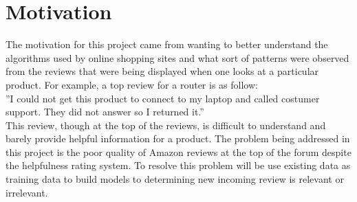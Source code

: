 \section{Motivation}
The motivation for this project came from wanting to better understand the algorithms used by online shopping sites and what sort of patterns were observed from the reviews that were being displayed when one looks at a particular product. For example, a top review for a router is as follow:\\

”I could not get this product to connect to my laptop and called costumer support. They did not answer so I returned it.”\\

This review, though at the top of the reviews, is difficult to understand and barely provide helpful information for a product. The problem being addressed in this project is the poor quality of Amazon reviews at the top of the forum despite the helpfulness rating system. To resolve this problem will be use existing data as training data to build models to determining new incoming review is relevant or irrelevant.
